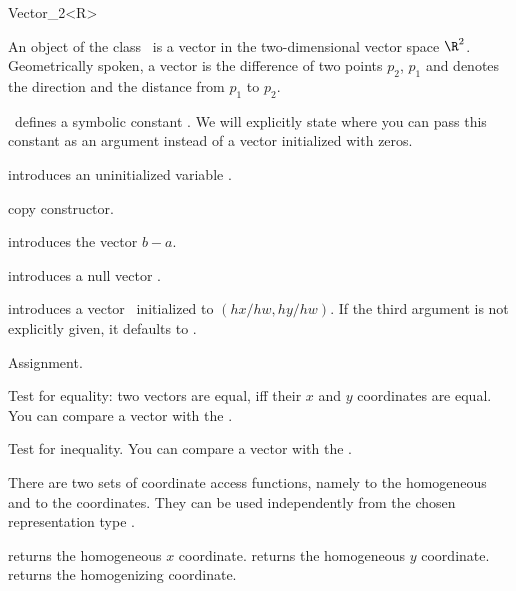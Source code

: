 \begin{ccRefClass} {Vector_2<R>}

\ccDefinition

An object of the class \ccRefName\ is a vector in the two-dimensional 
vector space $\R^2$. Geometrically spoken, a vector is the difference
of two points $p_2$, $p_1$ and denotes the direction and the distance
from   $p_1$ to $p_2$. 

\cgal\ defines a symbolic constant . We 
will explicitly state where you can pass this constant as an argument
instead of a vector initialized with zeros.


\ccCreation
{}


\ccHidden{}
             {introduces an uninitialized variable \ccVar.}

\ccHidden {}
 	    {copy constructor.}

 	    {introduces the vector $b-a$.}

 	    {introduces a null vector \ccVar.}

            {introduces a vector \ccVar\ initialized to $(hx/hw,hy/hw)$.
             If the third argument is not explicitly given, it defaults
             to .
             \ccPrecond {} }


\ccOperations

\ccHidden {}
        {Assignment.}

       {Test for equality: two vectors are equal, iff their $x$ and $y$ 
        coordinates are equal. You can compare a vector with the
        .}

       {Test for inequality. You can compare a vector with the
        .}


There are two sets of coordinate access functions, namely to the
homogeneous and to the  coordinates. They can be used
independently from the chosen representation type .

       {returns the homogeneous $x$ coordinate.}
\ccGlue
{}
       {returns the homogeneous $y$ coordinate.}
\ccGlue
{}
       {returns the homogenizing  coordinate.}


\end{ccRefClass}

